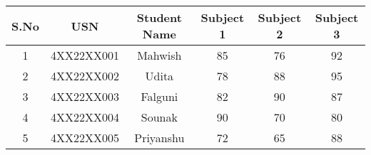 \documentclass{article}
\begin{document}
\begin{table}[h]
    \centering
  
    \begin{tabular}{@{}|c|c|c|c|c|c|@{}}
        \toprule
        \textbf{S.No} & \textbf{USN}       & \textbf{Student Name} & \textbf{Subject 1} & \textbf{Subject 2} & \textbf{Subject 3} \\ \midrule
        1              & 4XX22XX001        & Mahwish               & 85                  & 76       & 92                  \\ \hline
        2              & 4XX22XX002        & Udita                 & 78                  & 88                  & 95                  \\ \hline
        3              & 4XX22XX003        & Falguni               & 82                  & 90                  & 87                  \\ \hline
        4              & 4XX22XX004        & Sounak                & 90                  & 70                  & 80                  \\ \hline
        5              & 4XX22XX005        & Priyanshu             & 72                  & 65                  & 88                  \\ \bottomrule
    \end{tabular}
\end{table}
\end{document}
